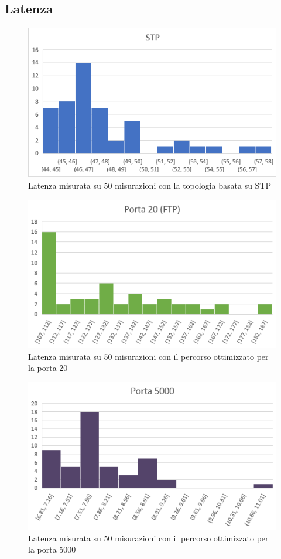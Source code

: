 \subsection{Latenza}\label{ch:3.3.1}
\begin{figure}[H]
	\centering
	\includegraphics[width=0.9\linewidth]{../immagini/esempio/ping_stp}
	\caption[Latenza STP]{Latenza misurata su 50 misurazioni con la topologia basata su STP}
	\label{fig:pingstp}
\end{figure}
\begin{figure}[H]
	\centering
	\includegraphics[width=0.9\linewidth]{../immagini/esempio/ping_ftp}
	\caption[Latenza Porta 20]{Latenza misurata su 50 misurazioni con il percorso ottimizzato per la porta 20}
	\label{fig:pingftp}
\end{figure}
\begin{figure}[H]
	\centering
	\includegraphics[width=0.9\linewidth]{../immagini/esempio/ping_5000}
	\caption[Latenza Porta 5000]{Latenza misurata su 50 misurazioni con il percorso ottimizzato per la porta 5000}
	\label{fig:ping5000}
\end{figure}
